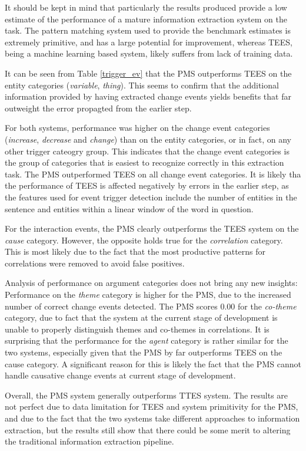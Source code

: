 It should be kept in mind that particularly the results produced provide a low estimate of the performance of a mature information extraction system on the task. The pattern matching system used to provide the benchmark estimates is extremely primitive, and has a large potential for improvement, whereas TEES, being a machine learning based system, likely suffers from lack of training data.

It can be seen from Table \ref{trigger_ev} that the PMS outperforms TEES on the entity categories (\emph{variable}, \emph{thing}). This seems to confirm that the additional information provided by having extracted change events yields benefits that far outweight the error propagted from the earlier step.

For both systems, performance was higher on the change event categories (\emph{increase}, \emph{decrease} and \emph{change}) than on the entity categories, or in fact, on any other trigger cateogry group. This indicates that the change event categories is the group of categories that is easiest to recognize correctly in this extraction task. The PMS outperformed TEES on all change event categories. It is likely tha the performance of TEES is affected negatively by errors in the earlier step, as the features used for event trigger detection include the number of entities in the sentence and entities within a linear window of the word in question.

For the interaction events, the PMS clearly outperforms the TEES system on the \emph{cause} category. However, the opposite holds true for the \emph{correlation} category. This is most likely due to the fact that the most productive patterns for correlations were removed to avoid false positives.

Analysis of performance on argument categories does not bring any new insights: Performance on the \emph{theme} category is higher for the PMS, due to the increased number of correct change events detected. The PMS scores 0.00 for the \emph{co-theme} category, due to fact that the system at the current stage of development is unable to properly distinguish themes and co-themes in correlations. It is surprising that the performance for the \emph{agent} category is rather similar for the two systems, especially given that the PMS by far outperforms TEES on the cause category. A significant reason for this is likely the fact that the PMS cannot handle causative change events at current stage of development.

Overall, the PMS system generally outperforms TTES system. The results are not perfect due to data limitation for TEES and system primitivity for the PMS, and due to the fact that the two systems take different approaches to information extraction, but the results still show that there could be some merit to altering the traditional information extraction pipeline.

